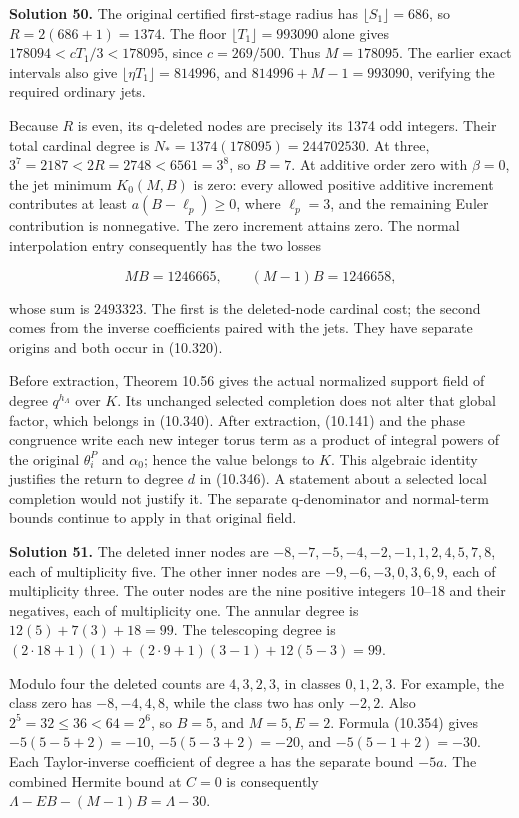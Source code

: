 \documentclass[
  11pt,
  a4paper,
]{article}
\begin{document}
\textbf{Solution 50.} The original certified first-stage radius has
\(\lfloor S_1\rfloor=686\), so \(R=2(686+1)=1374\). The floor
\(\lfloor T_1\rfloor=993090\) alone gives \(178094<cT_1/3<178095\),
since \(c=269/500\). Thus \(M=178095\). The earlier exact intervals also
give \(\lfloor\eta T_1\rfloor=814996\), and \(814996+M-1=993090\),
verifying the required ordinary jets.

Because \(R\) is even, its q-deleted nodes are precisely its 1374 odd
integers. Their total cardinal degree is \(N_*=1374(178095)=244702530\).
At three, \(3^7=2187<2R=2748<6561=3^8\), so \(B=7\). At additive order
zero with \(\beta=0\), the jet minimum \(K_0(M,B)\) is zero: every
allowed positive additive increment contributes at least
\(a(B-\ell_p)\ge0\), where \(\ell_p=3\), and the remaining Euler
contribution is nonnegative. The zero increment attains zero. The normal
interpolation entry consequently has the two losses

\[
MB=1246665,\qquad (M-1)B=1246658,
\]

whose sum is \(2493323\). The first is the deleted-node cardinal cost;
the second comes from the inverse coefficients paired with the jets.
They have separate origins and both occur in (10.320).

Before extraction, Theorem 10.56 gives the actual normalized support
field of degree \(q^{h_\Lambda}\) over \(K\). Its unchanged selected
completion does not alter that global factor, which belongs in (10.340).
After extraction, (10.141) and the phase congruence write each new
integer torus term as a product of integral powers of the original
\(\theta_i^P\) and \(\alpha_0\); hence the value belongs to \(K\). This
algebraic identity justifies the return to degree \(d\) in (10.346). A
statement about a selected local completion would not justify it. The
separate q-denominator and normal-term bounds continue to apply in that
original field.

\textbf{Solution 51.} The deleted inner nodes are
\(-8,-7,-5,-4,-2,-1,1,2,4,5,7,8\), each of multiplicity five. The other
inner nodes are \(-9,-6,-3,0,3,6,9\), each of multiplicity three. The
outer nodes are the nine positive integers 10--18 and their negatives,
each of multiplicity one. The annular degree is \(12(5)+7(3)+18=99\).
The telescoping degree is
\((2\cdot18+1)(1)+(2\cdot9+1)(3-1)+12(5-3)=99\).

Modulo four the deleted counts are \(4,3,2,3\), in classes \(0,1,2,3\).
For example, the class zero has \(-8,-4,4,8\), while the class two has
only \(-2,2\). Also \(2^5=32\le36<64=2^6\), so \(B=5\), and \(M=5,E=2\).
Formula (10.354) gives \(-5(5-5+2)=-10\), \(-5(5-3+2)=-20\), and
\(-5(5-1+2)=-30\). Each Taylor-inverse coefficient of degree a has the
separate bound \(-5a\). The combined Hermite bound at \(C=0\) is
consequently \(\Lambda-EB-(M-1)B=\Lambda-30\).
\end{document}
